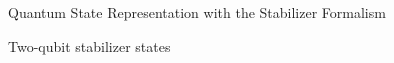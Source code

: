 \begin{frame}{Quantum State Representation with the
					\alert{Stabilizer Formalism}}
\begin{exampleblock}{Two-qubit stabilizer states}
%
%
\end{exampleblock}

				
\end{frame}	





